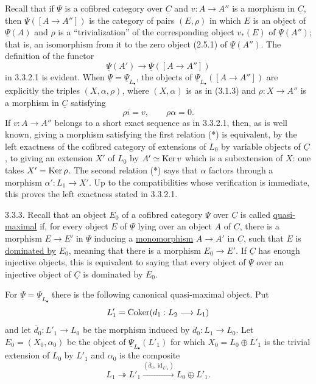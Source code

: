 Recall that if $\underline\Psi$ is a cofibred category over
$\underline C$ and $v:A\longrightarrow A''$ is a morphism in
$\underline C$, then $\underline\Psi([A\longrightarrow A''])$ is the
category of pairs $(E,\rho)$ in which $E$ is an object of
$\underline\Psi(A)$ and $\rho$ is a ``trivialization'' of the
corresponding object $v_*(E)$ of $\underline\Psi(A'')$; that is, an
isomorphism from it to the zero object (2.5.1) of
$\underline\Psi(A'')$. The definition of the functor
\[
 \underline\Psi(A')\longrightarrow
 \underline\Psi([A\longrightarrow A''])
\]
in 3.3.2.1 is evident. When
$\underline\Psi=\underline\Psi_{L_\bullet}$, the objects of
$\underline\Psi_{L_\bullet}([A\longrightarrow A''])$ are explicitly
the triples $(X,\alpha,\rho)$, where $(X,\alpha)$ is as in (3.1.3)
and $\rho:X\longrightarrow A''$ is a morphism in $\underline C$
satisfying
\begin{equation}\tag{*}
 \rho i=v,\qquad \rho\alpha=0.
\end{equation}
If $v:A\longrightarrow A''$ belongs to a short exact sequence as in
3.3.2.1, then, as is well known, giving a morphism satisfying the
first relation (*) is equivalent, by the left exactness of the
cofibred category of extensions of $L_0$ by variable objects of
$\underline C$, to giving an extension $X'$ of $L_0$ by
$A'\simeq\operatorname{Ker} v$ which is a subextension of $X$: one takes
$X'=\operatorname{Ker}\rho$. The second relation (*) says that $\alpha$ factors
through a morphism $\alpha':L_1\longrightarrow X'$. Up to the
compatibilities whose verification is immediate, this proves the
left exactness stated in 3.3.2.1.

3.3.3. Recall that an object $E_0$ of a cofibred category
$\underline\Psi$ over $\underline C$ is called \underline{quasi-maximal}
if, for every object $E$ of $\underline\Psi$ lying over an object
$A$ of $\underline C$, there is a morphism $E\longrightarrow E'$ in
$\underline\Psi$ inducing a \underline{monomorphism}
$A\longrightarrow A'$ in $\underline C$, such that $E$ is
\underline{dominated by} $E_0$, meaning that there is a morphism
$E_0\longrightarrow E'$. If $\underline C$ has enough injective
objects, this is equivalent to saying that every object of
$\underline\Psi$ over an injective object of $\underline C$ is
dominated by $E_0$.

For $\underline\Psi=\underline\Psi_{L_\bullet}$ there is the
following canonical quasi-maximal object. Put
\[
 L'_1=\operatorname{Coker}(d_1:L_2\longrightarrow L_1)
\]
and let $\bar d_0:L'_1\longrightarrow L_0$ be the morphism induced
by $d_0:L_1\longrightarrow L_0$. Let $E_0=(X_0,\alpha_0)$ be the
object of $\underline\Psi_{L_\bullet}(L'_1)$ for which
$X_0=L_0\oplus L'_1$ is the trivial extension of $L_0$ by $L'_1$
and $\alpha_0$ is the composite
\[
 L_1\twoheadrightarrow L'_1
 \xrightarrow{(\bar d_0,\,\mathrm{id}_{L'_1})}
 L_0\oplus L'_1.
\]

